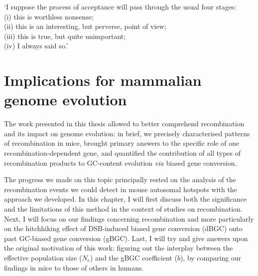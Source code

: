 \begin{savequote}[8cm]

	‘I suppose the process of acceptance will pass through the usual four stages:\\
	(i) this is worthless nonsense;\\
	(ii) this is an interesting, but perverse, point of view;\\
	(iii) this is true, but quite unimportant;\\
	(iv) I always said so.’
	
	
\end{savequote}

\chapter{\label{ch:9-discussion}Implications for mammalian genome evolution}


\minitoc{}


The work presented in this thesis allowed to better comprehend recombination and its impact on genome evolution: 
in brief, we precisely characterised patterns of recombination in mice, brought primary answers to the specific role of one recombination-dependent gene, and quantified the contribution of all types of recombination products to GC-content evolution \textit{via} biased gene conversion.

The progress we made on this topic principally rested on the analysis of the recombination events we could detect in mouse autosomal hotspots with the approach we developed. 
In this chapter, I will first discuss both the significance and the limitations of this method in the context of studies on recombination.
Next, I will focus on our findings concerning recombination and more particularly on the hitchhiking effect of DSB-induced biased gene conversion (dBGC) onto past GC-biased gene conversion (gBGC).
Last, I will try and give answers upon the original motivation of this work: figuring out the interplay between the effective population size ($N_e$) and the gBGC coefficient ($b$), by comparing our findings in mice to those of others in humans.

